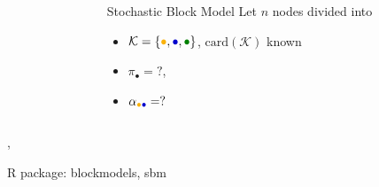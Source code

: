 \documentclass[compress,10pt]{beamer}
\begin{document}
\begin{frame}
\begin{center}
\begin{overlayarea}{\textwidth}{.5\textheight}
\begin{columns}
\begin{column}{.45\paperwidth}
        \end{column}
        \begin{column}{.5\paperwidth}
          \begin{small}
            \begin{block}{Stochastic Block Model}
              Let $n$ nodes divided into
              \begin{itemize}
              \item
                $\mathcal{K}=\{\textcolor{yellow!40!orange}{\bullet},\textcolor{blue!80!black}{\bullet},\textcolor{green!50!black}{\bullet}\}$,
                $\text{card}(\mathcal{K})$ known
              \item  $\pi_\bullet  =  ?$,
              \item      $\alpha_{\textcolor{yellow!40!orange}{\bullet}\textcolor{blue!80!black}{\bullet}}     =      ?$
              \end{itemize}
            \end{block}
          \end{small}
        \end{column}
      \end{columns}
    \end{overlayarea}
    \end{center}
    \medskip

    
   \cite{nowickiSnijders2001}, \cite{daudin2008mixture} 
    
    \bigskip
    
\textcolor{mygreen}{R package: blockmodels, sbm}
%     

\end{frame}
\end{document}
